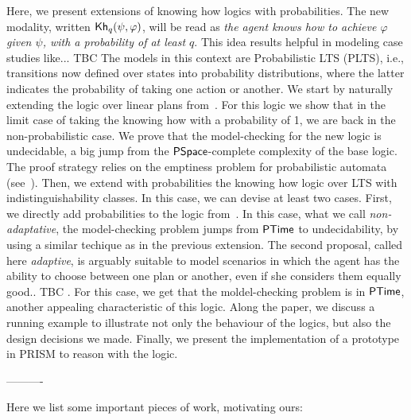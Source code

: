 Here, we present extensions of knowing how logics with probabilities. The new modality, written ${\mathsf{Kh}}_q(\psi,\varphi)$, will be read as \emph{the agent knows how to achieve $\varphi$ given $\psi$, with a probability of at least $q$}. This idea results helpful in modeling case studies like... TBC  The models in this context are Probabilistic LTS (PLTS), i.e., transitions now defined over states into probability distributions, where the latter indicates the probability of taking one action or another. We start by naturally extending the logic over linear plans from~\cite{Wang15lori,Wang16,Wang2016}. For this logic we show that in the limit case of taking the knowing how with a probability of 1, we are back in the non-probabilistic case. We prove that the model-checking for the new logic is undecidable, a big jump from the ${\rm\textsf{PSpace}}$-complete complexity of the base logic. The proof strategy relies on the emptiness problem for probabilistic automata (see~\cite{MadaniHC99}). Then, we extend with probabilities the knowing how logic over LTS with indistinguishability classes. In this case, we can devise at least two cases.  First, we directly add probabilities to the logic from~\cite{AFSVQ21,AFSVQ23}. In this case, what we call \emph{non-adaptative}, the model-checking problem jumps from ${\rm\textsf{PTime}}$ to undecidability, by using a similar techique as in the previous extension. The second proposal, called here \emph{adaptive}, is arguably suitable to model scenarios in which the agent has the ability to choose between one plan or another, even if she considers them equally good.. TBC . For this case, we get that the moldel-checking problem is in ${\rm\textsf{PTime}}$, another appealing characteristic of this logic. Along the paper, we discuss a running example to illustrate not only the behaviour of the logics, but also the design decisions we made. Finally, we present the implementation of a prototype in PRISM to reason with the logic. 

---------- 

Here we list some important pieces of work, motivating ours:

